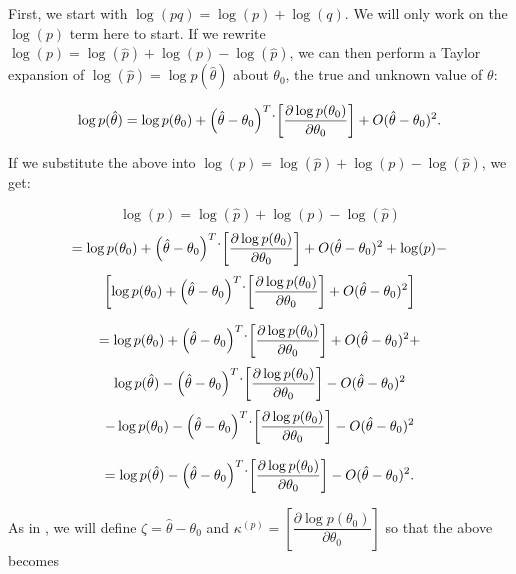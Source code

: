 \documentclass[12pt]{article}
\begin{document}
\par First, we start with $\log(pq) = \log(p) + \log(q)$.
We will only work on the $\log(p)$ term here to start. 
If we rewrite $\log(p) = \log(\hat{p}) + \log(p) - \log(\hat{p})$, we can then perform a Taylor expansion of $\log(\hat{p}) = \log p(\hat{\theta})$ about $\theta_0$, the true and unknown value of $\theta$:

$$\log p(\hat{\theta}) = \log p(\theta_0) + \left( \hat{\theta} - \theta_0 \right)^T \dot \\ \left[ \dfrac{\partial \log p({\theta_0})}{\partial {\theta_0}}  \right] + O(\hat{\theta} - \theta_0)^2. $$

If we substitute the above into $\log(p) = \log(\hat{p}) + \log(p) - \log(\hat{p})$, we get:

$$	\log(p)  = \log(\hat{p}) + \log(p) - \log(\hat{p}) $$
$$ = \log p(\theta_0) + \left( \hat{\theta} - \theta_0 \right)^T \dot \\ \left[ \dfrac{\partial \log p({\theta_0})}{\partial {\theta_0}}  \right] + O(\hat{\theta} - \theta_0)^2 + \log(p) - $$
$$ \left[ \log p(\theta_0) + \left( \hat{\theta} - \theta_0 \right)^T \dot \\ \left[ \dfrac{\partial \log p({\theta_0})}{\partial {\theta_0}}  \right] + O(\hat{\theta} - \theta_0)^2  \right] $$

$$ = \log p(\theta_0) + \left( \hat{\theta} - \theta_0 \right)^T \dot \\ \left[ \dfrac{\partial \log p({\theta_0})}{\partial {\theta_0}}  \right] + O(\hat{\theta} - \theta_0)^2 + $$
$$\log p(\hat{\theta}) - \left( \hat{\theta} - \theta_0 \right)^T \dot \\ \left[ \dfrac{\partial \log p({\theta_0})}{\partial {\theta_0}}  \right] - O(\hat{\theta} - \theta_0)^2 $$
$$ - \log p(\theta_0) - \left( \hat{\theta} - \theta_0 \right)^T \dot \\ \left[ \dfrac{\partial \log p({\theta_0})}{\partial {\theta_0}}  \right] - O(\hat{\theta} - \theta_0)^2  $$

$$ = \log p(\hat{\theta}) - \left( \hat{\theta} - \theta_0 \right)^T \dot \\ \left[ \dfrac{\partial \log p({\theta_0})}{\partial {\theta_0}}  \right] - O(\hat{\theta} - \theta_0)^2. $$

As in \citet{bravington_variance_2021}, we will define $\zeta = \hat{\theta} - \theta_0$ and $\kappa^{(p)} = \left[ \dfrac{\partial \log p({\theta_0})}{\partial {\theta_0}}  \right]$ so that the above becomes
\end{document}
